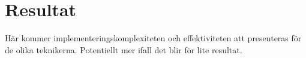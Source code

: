 \section{Resultat}
\label{sec:bjorn-results}

Här kommer implementeringskomplexiteten och effektiviteten att presenteras för de olika teknikerna. Potentiellt mer ifall det blir för lite resultat.